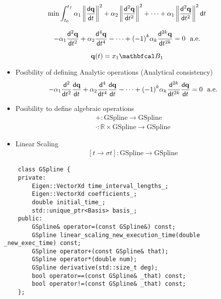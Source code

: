 
\begin{frame}[t]

	\begin{equation*}
		\min \int_{t_0}^{t_f} \alpha_1 \left\|\frac{\mathsf{d} \mathbf{q}}{\mathsf{d} t}\right\|^2 + \alpha_2 \left\|\frac{\mathsf{d}^{2} \mathbf{q}}{\mathsf{d} t^{2}}\right\|^2 + \cdots  + \alpha_1 \left\|\frac{\mathsf{d}^{2} \mathbf{q}}{\mathsf{d} t^{2}} \right\|^2 \mathsf{d} t
	\end{equation*}

	\begin{equation*}
		-\alpha_1 \diffk{\qv}{t}{2}+ \alpha_2 \diffk{\qv}{t}{4}- \cdots +  {(-1)}^k \alpha_k \diffk{\qv}{t}{2k}= 0 \ \ \text{a.e.}
	\end{equation*}

	\begin{equation*}
		\qv(t) = x_1 \basis_1
	\end{equation*}
\end{frame}

\begin{frame}[t]

	\begin{itemize}
		\item Posibility of defining Analytic operations (Analytical consistency)
		      \begin{equation*}
			      -\alpha_1 \diffk{}{t}{2} \diff{\qv}{t}+ \alpha_2 \diffk{}{t}{4}\diff{\qv}{t}- \cdots +  {(-1)}^k \alpha_k \diffk{}{t}{2k}\diff{\qv}{t}= 0 \ \ \text{a.e.}
		      \end{equation*}
		\item Posibility to define algebraic operations
		      \begin{eqnarray*}
			      +:\text{GSpline}\longrightarrow \text{GSpline}\\
			      \cdot:\mathbb{R} \times \text{GSpline}\longrightarrow \text{GSpline}
		      \end{eqnarray*}
		\item Linear Scaling
		      \begin{eqnarray*}
			      \left[t \rightarrow \sigma t \right]:\text{GSpline}\longrightarrow \text{GSpline}
		      \end{eqnarray*}
	\end{itemize}
\end{frame}

\begin{frame}[fragile]

	\begin{lstlisting}
    class GSpline {
    private:
        Eigen::VectorXd time_interval_lengths_;
        Eigen::VectorXd coefficients_;
        double initial_time_;
        std::unique_ptr<Basis> basis_;
    public:
        GSpline& operator=(const GSpline&) const;
        GSpline linear_scaling_new_execution_time(double _new_exec_time) const;
        GSpline operator+(const GSpline& that);
        GSpline operator*(double num);
        GSpline derivative(std::size_t deg);
        bool operator==(const GSpline& _that) const;
        bool operator!=(const GSpline& _that) const;
    };
    \end{lstlisting}
\end{frame}


